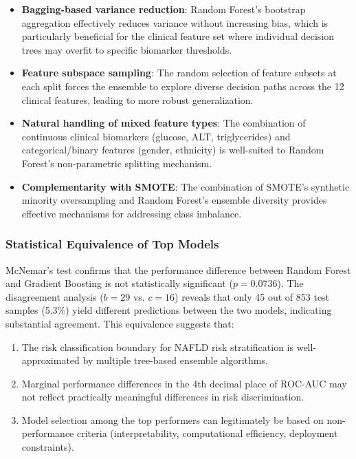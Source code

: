 \documentclass[conference,10pt]{IEEEtran}
\begin{document}
\begin{itemize}
    \item \textbf{Bagging-based variance reduction}: Random Forest's bootstrap aggregation effectively reduces variance without increasing bias, which is particularly beneficial for the clinical feature set where individual decision trees may overfit to specific biomarker thresholds.

    \item \textbf{Feature subspace sampling}: The random selection of feature subsets at each split forces the ensemble to explore diverse decision paths across the 12 clinical features, leading to more robust generalization.

    \item \textbf{Natural handling of mixed feature types}: The combination of continuous clinical biomarkers (glucose, ALT, triglycerides) and categorical/binary features (gender, ethnicity) is well-suited to Random Forest's non-parametric splitting mechanism.

    \item \textbf{Complementarity with SMOTE}: The combination of SMOTE's synthetic minority oversampling and Random Forest's ensemble diversity provides effective mechanisms for addressing class imbalance.
\end{itemize}

\subsubsection{Statistical Equivalence of Top Models}

McNemar's test confirms that the performance difference between Random Forest and Gradient Boosting is not statistically significant ($p = 0.0736$). The disagreement analysis ($b = 29$ vs. $c = 16$) reveals that only 45 out of 853 test samples (5.3\%) yield different predictions between the two models, indicating substantial agreement. This equivalence suggests that:

\begin{enumerate}
    \item The risk classification boundary for NAFLD risk stratification is well-approximated by multiple tree-based ensemble algorithms.
    \item Marginal performance differences in the 4th decimal place of ROC-AUC may not reflect practically meaningful differences in risk discrimination.
    \item Model selection among the top performers can legitimately be based on non-performance criteria (interpretability, computational efficiency, deployment constraints).
\end{enumerate}
\end{document}
